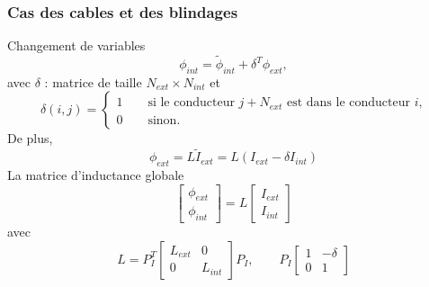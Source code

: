 \begin{frame}
\frametitle{Cas des cables et des blindages}
Changement de variables
\begin{equation}
\phi_{int} = \tilde{\phi}_{int} +\delta^T \phi_{ext},
\end{equation}
avec $\delta$ : matrice de taille $N_{ext}\times N_{int}$ et
\begin{equation}
\delta(i,j)=
\begin{cases}
1 \qquad \text{si le conducteur $j+N_{ext}$ est dans le conducteur $i$,} \\
0 \qquad \text{sinon.}
\end{cases}
\end{equation}
De plus,
\begin{equation}
\phi_{ext} = L\tilde{I}_{ext}=L(I_{ext}-\delta I_{int})
\end{equation}
La matrice d'inductance globale
\[ \left[ \begin{array} {c}
\phi_{ext} \\
\phi_{int} \end{array}  \right]  =
L
 \left[ \begin{array} {c}
I_{ext} \\
I_{int} \end{array}  \right]
\]
avec
\[ L = P_I^T \left[ \begin{array} {cc}
L_{ext} &0 \\
0 & L_{int} \end{array}  \right] P_I , \qquad
P_I
\left[ \begin{array} {cc}
1 & -\delta \\
0 & 1 \end{array}  \right]
 \]

\end{frame}
